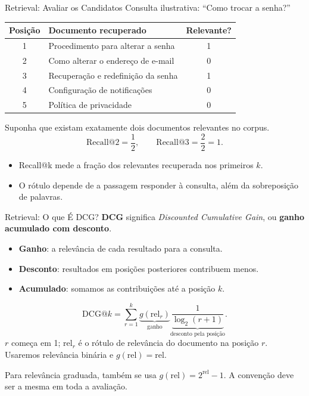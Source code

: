 \documentclass[aspectratio=169, xcolor=dvipsnames]{beamer}
\begin{document}
  \begin{frame}{Retrieval: Avaliar os Candidatos}
    Consulta ilustrativa: ``Como trocar a senha?''
    \begin{center}\small
      \begin{tabular}{clc}
        \toprule
        Posição & Documento recuperado & Relevante?\\
        \midrule
        1 & Procedimento para alterar a senha & 1\\
        2 & Como alterar o endereço de e-mail & 0\\
        3 & Recuperação e redefinição da senha & 1\\
        4 & Configuração de notificações & 0\\
        5 & Política de privacidade & 0\\
        \bottomrule
      \end{tabular}
    \end{center}
    Suponha que existam exatamente dois documentos relevantes no corpus.
    \[
      \mathrm{Recall@2}=\frac{1}{2},\qquad \mathrm{Recall@3}=\frac{2}{2}=1.
    \]
    \begin{itemize}
      \item Recall@k mede a fração dos relevantes recuperada nos primeiros $k$.
      \item O rótulo depende de a passagem responder à consulta, além da sobreposição de palavras.
    \end{itemize}
  \end{frame}

  \begin{frame}{Retrieval: O que É DCG?}
    \textbf{DCG} significa \textit{Discounted Cumulative Gain},
    ou \textbf{ganho acumulado com desconto}.
    \begin{itemize}
      \item \textbf{Ganho}: a relevância de cada resultado para a consulta.
      \item \textbf{Desconto}: resultados em posições posteriores contribuem menos.
      \item \textbf{Acumulado}: somamos as contribuições até a posição $k$.
    \end{itemize}
    \[
      \mathrm{DCG@}k=\sum_{r=1}^{k}
      \underbrace{g(\mathrm{rel}_r)}_{\text{ganho}}
      \underbrace{\frac{1}{\log_2(r+1)}}_{\text{desconto pela posição}}.
    \]
    \small $r$ começa em 1; $\mathrm{rel}_r$ é o rótulo de relevância do
    documento na posição $r$. Usaremos relevância binária e $g(\mathrm{rel})=\mathrm{rel}$.
    \par\medskip
    Para relevância graduada, também se usa $g(\mathrm{rel})=2^{\mathrm{rel}}-1$.
    A convenção deve ser a mesma em toda a avaliação.
  \end{frame}
\end{document}
